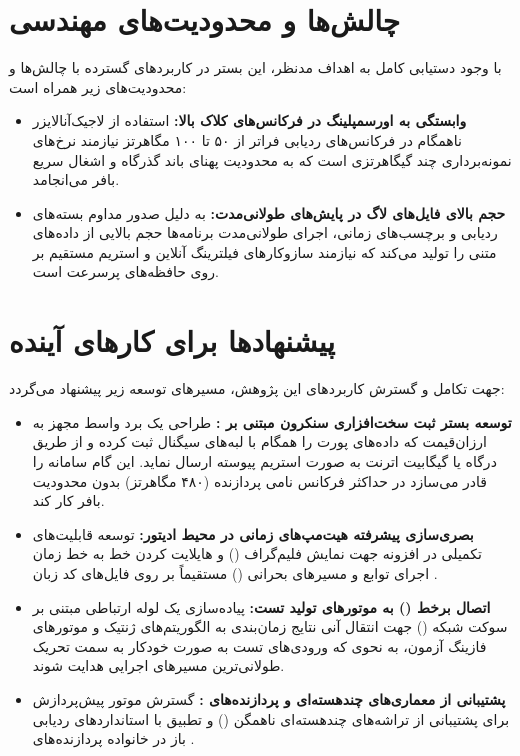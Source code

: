\section{چالش‌ها و محدودیت‌های مهندسی}
با وجود دستیابی کامل به اهداف مدنظر، این بستر در کاربردهای گسترده با چالش‌ها و محدودیت‌های زیر همراه است:
\begin{itemize}
    \item \textbf{وابستگی به اورسمپلینگ در فرکانس‌های کلاک بالا:}
    استفاده از لاجیک‌آنالایزر ناهمگام در فرکانس‌های ردیابی فراتر از ۵۰ تا ۱۰۰ مگاهرتز نیازمند نرخ‌های نمونه‌برداری چند گیگاهرتزی است که به محدودیت پهنای باند گذرگاه  و اشغال سریع بافر  می‌انجامد.
    \item \textbf{حجم بالای فایل‌های لاگ در پایش‌های طولانی‌مدت:}
    به دلیل صدور مداوم بسته‌های ردیابی و برچسب‌های زمانی، اجرای طولانی‌مدت برنامه‌ها حجم بالایی از داده‌های متنی را تولید می‌کند که نیازمند سازوکارهای فیلترینگ آنلاین و استریم مستقیم بر روی حافظه‌های پرسرعت است.
\end{itemize}

\section{پیشنهادها برای کارهای آینده}
جهت تکامل و گسترش کاربردهای این پژوهش، مسیرهای توسعه زیر پیشنهاد می‌گردد:
\begin{itemize}
    \item \textbf{توسعه بستر ثبت سخت‌افزاری سنکرون مبتنی بر :}
    طراحی یک برد واسط مجهز به  ارزان‌قیمت که داده‌های پورت  را همگام با لبه‌های سیگنال  ثبت کرده و از طریق درگاه  یا گیگابیت اترنت به صورت استریم پیوسته ارسال نماید. این گام سامانه را قادر می‌سازد در حداکثر فرکانس نامی پردازنده (۴۸۰ مگاهرتز) بدون محدودیت بافر کار کند.
    \item \textbf{بصری‌سازی پیشرفته هیت‌مپ‌های زمانی در محیط ادیتور:}
    توسعه قابلیت‌های تکمیلی در افزونه  جهت نمایش فلیم‌گراف () و هایلایت کردن خط به خط زمان اجرای توابع و مسیرهای بحرانی () مستقیماً بر روی فایل‌های کد زبان .
    \item \textbf{اتصال برخط () به موتورهای تولید تست:}
    پیاده‌سازی یک لوله ارتباطی مبتنی بر سوکت شبکه () جهت انتقال آنی نتایج زمان‌بندی به الگوریتم‌های ژنتیک و موتورهای فازینگ آزمون، به نحوی که ورودی‌های تست به صورت خودکار به سمت تحریک طولانی‌ترین مسیرهای اجرایی هدایت شوند.
    \item \textbf{پشتیبانی از معماری‌های چند‌هسته‌ای و پردازنده‌های :}
    گسترش موتور پیش‌پردازش برای پشتیبانی از تراشه‌های چند‌هسته‌ای ناهمگن () و تطبیق با استانداردهای ردیابی باز در خانواده پردازنده‌های .
\end{itemize}
